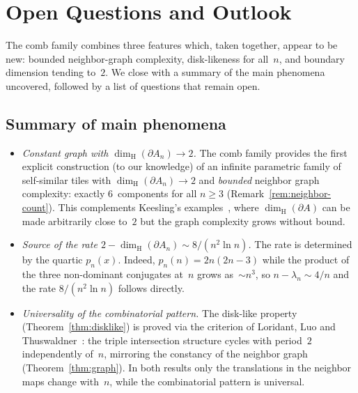 \documentclass{amsart}
\theoremstyle{definition}
\theoremstyle{remark}
\newcommand{\dH}{\dim_{\mathrm{H}}}
\begin{document}
\section{Open Questions and Outlook}
\label{sec:discussion}

The comb family combines three features which, taken together,
appear to be new: bounded neighbor-graph complexity, disk-likeness
for all~$n$, and boundary dimension tending to~$2$.  We close with
a summary of the main phenomena uncovered, followed by a list of
questions that remain open.

\subsection*{Summary of main phenomena}

\begin{itemize}

\item \emph{Constant graph with $\dH(\partial A_n) \to 2$.}
The comb family provides the first explicit construction (to our
knowledge) of an infinite parametric family of self-similar tiles
with $\dH(\partial A_n) \to 2$ and \emph{bounded} neighbor graph
complexity: exactly $6$~components for all $n \ge 3$
(Remark~\ref{rem:neighbor-count}).  This complements
Keesling's examples~\cite{keesling}, where $\dH(\partial A)$ can
be made arbitrarily close to~$2$ but the graph complexity grows
without bound.

\item \emph{Source of the rate $2 - \dH(\partial A_n) \sim 8/(n^2\ln n)$.}
The rate is determined by the quartic $p_n(x)$.  Indeed,
$p_n(n) = 2n(2n{-}3)$ while the product of the three
non-dominant conjugates at~$n$ grows as~$\sim n^3$, so
$n - \lambda_n \sim 4/n$ and the rate $8/(n^2\ln n)$ follows
directly.

\item \emph{Universality of the combinatorial pattern.}
The disk-like property (Theorem~\ref{thm:disklike}) is proved via
the criterion of Loridant, Luo and
Thuswaldner~\cite{loridant-luo-thuswaldner}: the triple
intersection structure cycles with period~$2$ independently
of~$n$, mirroring the constancy of the neighbor graph
(Theorem~\ref{thm:graph}).  In both results only the translations
in the neighbor maps change with~$n$, while the combinatorial
pattern is universal.

\end{itemize}
\end{document}
